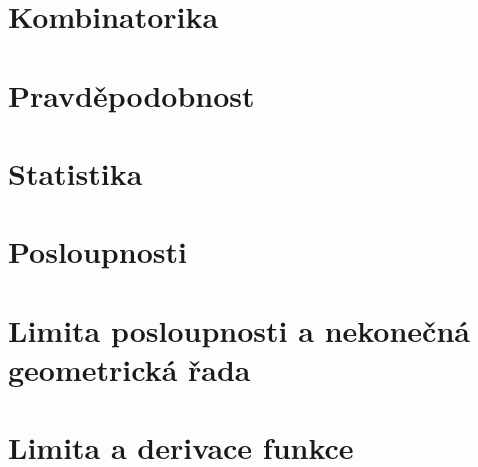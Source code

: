 \documentclass[12pt, a4paper]{article}
\begin{document}
\section{Kombinatorika}
\section{Pravděpodobnost}
\section{Statistika}
\section{Posloupnosti}
\section{Limita posloupnosti a nekonečná geometrická řada}
\section{Limita a derivace funkce}
\end{document}
